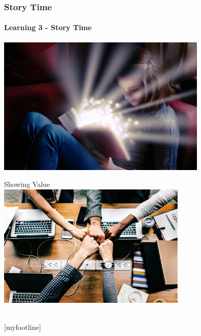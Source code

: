 \documentclass[aspectratio=169]{beamer}
\begin{document}
\begin{frame}
  \frametitle{Story Time}
  \framesubtitle{Learning 3 - Story Time}
  \begin{center}
    \includegraphics[width=10cm,keepaspectratio]{story_time}
  \end{center}
\end{frame}


\begin{frame}[t]
  \begin{center}
    \begingroup
    \fontsize{20pt}{20pt}\selectfont
    Showing Value \\
    \endgroup
    \bigskip
    \includegraphics[width=9cm,keepaspectratio]{value} \\
    \bigskip
    \inserttitle \\
  \end{center}
\end{frame}

[myfootline]
\end{document}
